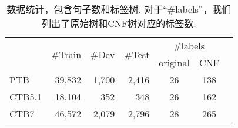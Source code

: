 \begin{table}[tb!]
    \centering
    \begin{tabular}{lrrr|ccc}
        \toprule
               & \multirow{2}{*}{\#Train} & \multirow{2}{*}{\#Dev} & \multirow{2}{*}{\#Test} & \multicolumn{2}{c}{\#labels}       \\
               &                          &                        &                         & original                     & CNF \\[1pt]
        \midrule
        PTB    & 39,832                   & 1,700                  & 2,416                   & 26                           & 138 \\
        CTB5.1 & 18,104                   & 352                    & 348                     & 26                           & 162 \\
        CTB7   & 46,572                   & 2,079                  & 2,796                   & 28                           & 265 \\
        \bottomrule
    \end{tabular}
    \caption{数据统计，包含句子数和标签树.
        对于``\#labels''，我们列出了原始树和CNF树对应的标签数.}
    \label{table:con-statistics}
\end{table}